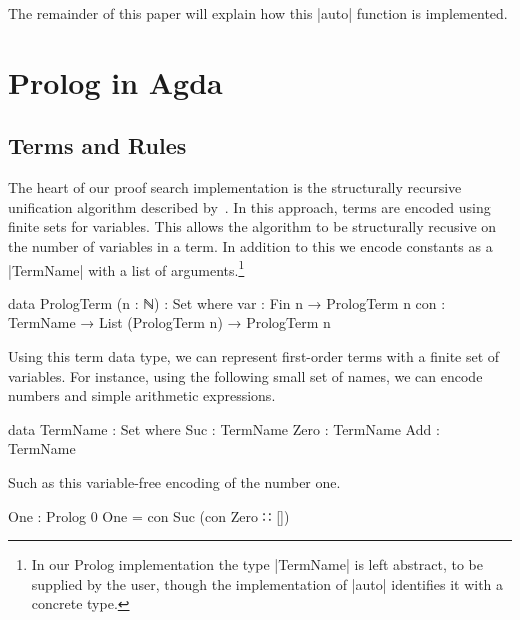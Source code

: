 \documentclass[preprint]{sigplanconf}
\begin{document}
The remainder of this paper will explain how this |auto| function is
implemented.

\section{Prolog in Agda}
\label{sec:prolog}

\subsection*{Terms and Rules}

The heart of our proof search implementation is the structurally recursive
unification algorithm described by~\citet{unification}. In this approach, terms
are encoded using finite sets for variables. This allows the algorithm to
be structurally recusive on the number of variables in a term. In addition
to this we encode constants as a |TermName| with a list of
arguments.\footnote{
  In our Prolog implementation the type |TermName| is left abstract,
  to be supplied by the user, though the implementation of |auto|
  identifies it with a concrete type.
}

\begin{code}
data PrologTerm (n : ℕ) : Set where
  var  : Fin n → PrologTerm n
  con  : TermName → List (PrologTerm n) → PrologTerm n
\end{code}


\noindent
Using this term data type, we can represent first-order terms with a
finite set of variables. For instance, using the following small set
of names, we can encode numbers and simple arithmetic expressions.
\begin{code}
data TermName : Set where
  Suc   : TermName
  Zero  : TermName
  Add   : TermName
\end{code}
Such as this variable-free encoding of the number one.
\begin{code}
One : Prolog 0
One = con Suc (con Zero ∷ [])
\end{code}
\end{document}
